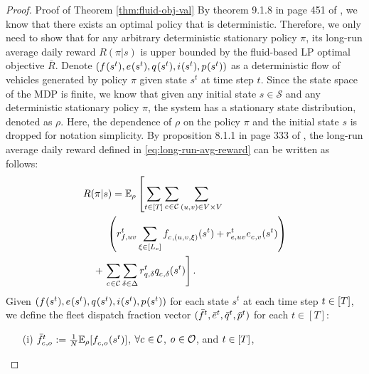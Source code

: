 \begin{proof}{Proof of Theorem \ref{thm:fluid-obj-val}}
    By theorem 9.1.8 in page 451 of \cite{PutermanMDP}, we know that there exists an optimal policy that is deterministic. Therefore, we only need to show that for any arbitrary deterministic stationary policy $\pi$, its long-run average daily reward $R(\pi \vert s)$ is upper bounded by the fluid-based LP optimal objective $\bar{R}$. Denote $(\jointtripfulfillaction{}{}(s^t), \jointreroutingaction{}{}(s^t), \jointchargingaction{}{}(s^t), \jointidlingaction{}{}(s^t), \jointpassaction{}{}(s^t))$ as a  deterministic flow of vehicles generated by policy $\pi$ given state $s^t$ at time step $t$. Since the state space of the MDP is finite, we know that given any initial state $s \in \mathcal{S}$ and any deterministic stationary policy $\pi$, the system has a stationary state distribution, denoted as $\rho$. Here, the dependence of $\rho$ on the policy $\pi$ and the initial state $s$ is dropped for notation simplicity. By proposition 8.1.1 in page 333 of \cite{PutermanMDP}, the long-run average daily reward defined in \eqref{eq:long-run-avg-reward} can be written as follows: 
    \begin{align*}
        &R(\pi|s) = \mathbb{E}_{\rho}  \left[\sum_{\time \in [\Horizon]}^{} \sum_{\cartype{} \in \Cartype} \sum_{(\origin, \destination) \in \Region \times \Region} \right. \\
        &\qquad\  \left(\tripfulfillreward{,\origin\destination}{\time}  \sum_{\tripactivetime \in [\Lc]}^{} \jointtripfulfillaction{\cartype{}, (\origin, \destination, \xi)}{}(s^{\time}) + \reroutingreward{,\origin\destination}{\time} \jointreroutingaction{\cartype{}, \destination}{}(s^t) \right)\\ 
        &\quad+ \left. \sum_{\cartype{} \in \Cartype}\sum_{\type \in \Type} \chargingreward{,\type}{\time} \jointchargingaction{\cartype{},\type}{}(s^t) \right].
    \end{align*}
    Given $(\jointtripfulfillaction{}{}(s^t), \jointreroutingaction{}{}(s^t), \jointchargingaction{}{}(s^t), \jointidlingaction{}{}(s^t), \jointpassaction{}{}(s^t))$ for each state $s^t$ at each time step $t \in [\Horizon]$, we define the fleet dispatch fraction vector $(\lptripfulfill{}{t}, \lpreroute{}{t}, \lpcharge{}{t}, \lppass{}{t})$ for each $t \in [T]$:
    \begin{enumerate}
        \item[(i)] $\lptripfulfill{\cartype{}, \triptype{}}{t} := \frac{1}{\Size} \mathbb{E}_{\rho}[ \jointtripfulfillaction{\cartype{}, \triptype{}}{}(s^t)]$, $\forall \cartype{} \in \Cartype$, $\triptype{} \in \Triptype$, and $\time \in [\Horizon]$,

\end{enumerate}
\end{proof}
